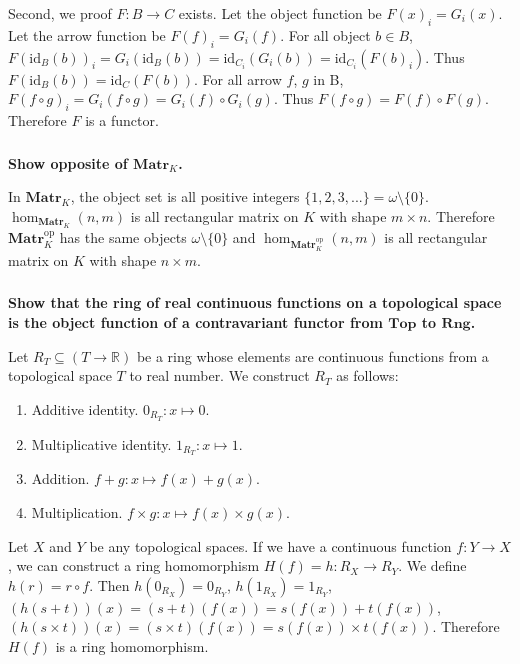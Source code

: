 \documentclass{article}
\begin{document}
Second, we proof $F : B \rightarrow C$ exists. Let the object function be $F(x)_i = G_i(x)$. Let the arrow function be $F(f)_i = G_i(f)$. For all object $b \in B$, $F(\mathrm{id}_B(b))_i = G_i(\mathrm{id}_B(b)) =  \mathrm{id}_{C_i}(G_i(b)) = \mathrm{id}_{C_i}(F(b)_i)$. Thus $F(\mathrm{id}_B(b)) = \mathrm{id}_{C}(F(b))$. For all arrow $f$, $g$ in B, $F(f \circ g)_i = G_i(f \circ g) = G_i(f) \circ G_i(g)$. Thus $F(f \circ g) = F(f) \circ F(g)$. Therefore $F$ is a functor.

\subsubsection{}

\textbf{Show opposite of $\mathbf{Matr}_K$.}

In $\mathbf{Matr}_K$, the object set is all positive integers $\{1, 2, 3, ...\} = \omega \setminus \{0\}$. $\hom_{\mathbf{Matr}_K}(n, m)$ is all rectangular matrix on $K$ with shape $m \times n$. Therefore $\mathbf{Matr}_K^{\mathrm{op}}$ has the same objects $\omega \setminus \{0\}$ and  $\hom_{\mathbf{Matr}_K^{\mathrm{op}}}(n, m)$ is all rectangular matrix on $K$ with shape $n \times m$.

\subsubsection{}

\textbf{Show that the ring of real continuous functions on a topological space is the object function of a contravariant functor from $\mathbf{Top}$ to $\mathbf{Rng}$.}

Let $R_T \subseteq (T \rightarrow \mathbb{R})$ be a ring whose elements are continuous functions from a topological space $T$ to real number. We construct $R_T$ as follows:

\begin{enumerate}
    \item Additive identity. $0_{R_T} : x \mapsto 0$.
    \item Multiplicative identity. $1_{R_T} : x \mapsto 1$.
    \item Addition. $f + g : x \mapsto f(x) + g(x)$.
    \item Multiplication. $f \times g : x \mapsto f(x) \times g(x)$.
\end{enumerate}

Let $X$ and $Y$ be any topological spaces. If we have a continuous function $f : Y \rightarrow X$, we can construct a ring homomorphism $H(f) = h : R_X \rightarrow R_Y$. We define $h(r) = r \circ f$. Then $h(0_{R_X}) = 0_{R_Y}$, $h(1_{R_X}) = 1_{R_Y}$, $(h(s + t))(x) = (s + t)(f(x)) = s(f(x)) + t(f(x))$, $(h(s \times t))(x) = (s \times t)(f(x)) = s(f(x)) \times t(f(x))$. Therefore $H(f)$ is a ring homomorphism.
\end{document}
